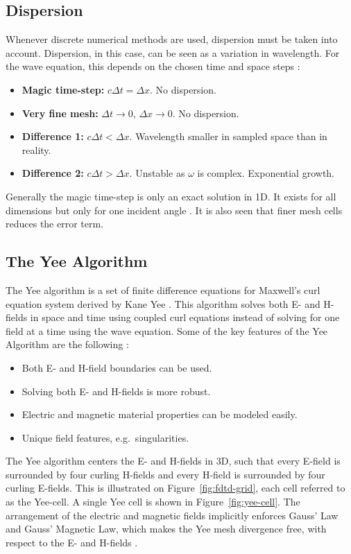 \subsection{Dispersion}
Whenever discrete numerical methods are used, dispersion must be taken into account. Dispersion, in this case, can be seen as a variation in wavelength. For the wave equation, this depends on the chosen time and space steps \cite{taflove2000computional}:
\begin{itemize}
\item \textbf{Magic time-step:} $c\Delta t = \Delta x$. No dispersion.
\item \textbf{Very fine mesh:} $\Delta t \rightarrow 0$, $\Delta x \rightarrow 0$. No dispersion.
\item \textbf{Difference 1:} $c\Delta t < \Delta x$. Wavelength smaller in sampled space than in reality.
\item \textbf{Difference 2:} $c\Delta t > \Delta x$. Unstable as $\omega$ is complex. Exponential growth.
\end{itemize}
Generally the magic time-step is only an exact solution in 1D. It exists for all dimensions but only for one incident angle \cite{taflove2000computional}. It is also seen that finer mesh cells reduces the error term.  

\subsection{The Yee Algorithm}
The Yee algorithm is a set of finite difference equations for Maxwell's curl equation system derived by Kane Yee \cite{taflove2000computional}. This algorithm solves both E- and H-fields in space and time using coupled curl equations instead of solving for one field at a time using the wave equation. Some of the key features of the Yee Algorithm are the following \cite{taflove2000computional}:
\begin{itemize}
\item Both E- and H-field boundaries can be used.
\item Solving both E- and H-fields is more robust.
\item Electric and magnetic material properties can be modeled easily.
\item Unique field features, e.g.\ singularities. 
\end{itemize}
The Yee algorithm centers the E- and H-fields in 3D, such that every E-field is surrounded by four curling H-fields and every H-field is surrounded by four curling E-fields. This is illustrated on Figure~\ref{fig:fdtd-grid}, each cell referred to as the Yee-cell. A single Yee cell is shown in Figure~\ref{fig:yee-cell}. The arrangement of the electric and magnetic fields implicitly enforces Gauss' Law and Gauss' Magnetic Law, which makes the Yee mesh divergence free, with respect to the E- and H-fields \cite{taflove2000computional}.  

